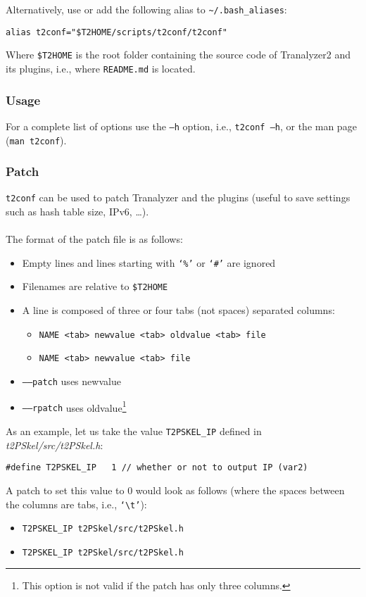 \documentclass[documentation]{subfiles}
\begin{document}
Alternatively, use  or add the following alias to {\tt \textasciitilde{}/.bash\_aliases}:
\begin{center}
    {\tt alias t2conf="\$T2HOME/scripts/t2conf/t2conf"}
\end{center}
Where {\tt \$T2HOME} is the root folder containing the source code of Tranalyzer2 and its plugins, i.e., where {\tt README.md} is located.

\subsubsection{Usage}
For a complete list of options use the {\tt --h} option, i.e., {\tt t2conf --h}, or the man page ({\tt man t2conf}).

\subsubsection{Patch}\label{t2confpatch}
{\tt t2conf} can be used to patch Tranalyzer and the plugins (useful to save settings such as hash table size, IPv6, \ldots).\\\\
The format of the patch file is as follows:
\begin{itemize}
    \item Empty lines and lines starting with {\tt `\%'} or {\tt `\#'} are ignored
    \item Filenames are relative to {\tt \$T2HOME}
    \item A line is composed of three or four tabs (not spaces) separated columns:
        \begin{itemize}
            \item {\tt NAME <tab> newvalue <tab> oldvalue <tab> file}
            \item {\tt NAME <tab> newvalue <tab> file}
        \end{itemize}
    \item {\tt --{}--patch} uses newvalue
    \item {\tt --{}--rpatch} uses oldvalue\footnote{This option is not valid if the patch has only three columns.}
\end{itemize}

As an example, let us take the value {\tt T2PSKEL\_IP} defined in {\em t2PSkel/src/t2PSkel.h}:
\begin{center}
    {\tt \#define T2PSKEL\_IP~~~1 // whether or not to output IP (var2)}
\end{center}
A patch to set this value to 0 would look as follows (where the spaces between the columns are tabs, i.e., {\tt `\textbackslash{}t'}):
\begin{itemize}
    \item {\tt T2PSKEL\_IP   \qquad t2PSkel/src/t2PSkel.h}
    \item {\tt T2PSKEL\_IP  \qquad t2PSkel/src/t2PSkel.h}
\end{itemize}
\end{document}
